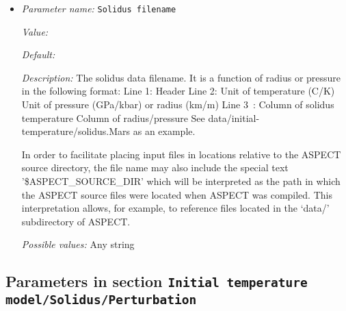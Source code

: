 \begin{itemize}
\item {\it Parameter name:} {\tt Solidus filename}
\label{parameters:Initial temperature model/Solidus/Data/Solidus filename}


{\it Value:} 


{\it Default:} 


{\it Description:} The solidus data filename. It is a function of radius or pressure in the following format: 
Line 1:  Header 
Line 2:  Unit of temperature (C/K)        Unit of pressure (GPa/kbar) or radius (km/m) 
Line 3~: Column of solidus temperature    Column of radius/pressure 
See data/initial-temperature/solidus.Mars as an example.

In order to facilitate placing input files in locations relative to the ASPECT source directory, the file name may also include the special text '\$ASPECT\_SOURCE\_DIR' which will be interpreted as the path in which the ASPECT source files were located when ASPECT was compiled. This interpretation allows, for example, to reference files located in the `data/' subdirectory of ASPECT.


{\it Possible values:} Any string
\end{itemize}

\subsection{Parameters in section \tt Initial temperature model/Solidus/Perturbation}
\label{parameters:Initial_20temperature_20model/Solidus/Perturbation}

